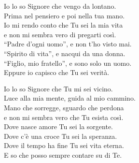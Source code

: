 
\strofa Io lo so Signore che vengo da lontano.\\
Prima nel pensiero e poi nella tua mano.\\
Io mi rendo conto che Tu sei la mia vita\\
e non mi sembra vero di pregarti così.\\
``Padre d'ogni uomo'', e non t'ho visto mai.\\
``Spirito di vita'', e nacqui da una donna.\\
``Figlio, mio fratello'', e sono solo un uomo.\\
Eppure io capisco che Tu sei verità.

\spazio

 

\spazio

\strofa Io lo so Signore che Tu mi sei vicino.\\
Luce alla mia mente, guida al mio cammino.\\
Mano che sorregge, sguardo che perdona\\
e non mi sembra vero che Tu esista così.\\
Dove nasce amore Tu sei la sorgente.\\
Dove c'è una croce Tu sei la speranza.\\
Dove il tempo ha fine Tu sei vita eterna.\\
E so che posso sempre contare su di Te.

\spazio

 